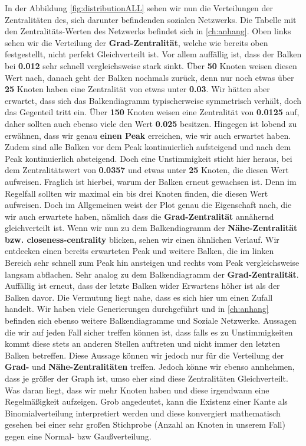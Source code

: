 In der Abbildung \ref{fig:distributionALL} sehen wir nun die Verteilungen der Zentralitäten des, sich darunter befindenden sozialen Netzwerks. Die Tabelle mit den Zentralitäts-Werten des Netzwerks befindet sich in \ref{ch:anhang}. Oben links sehen wir die Verteilung der \textbf{Grad-Zentralität}, welche wie bereits oben festgestellt, nicht perfekt Gleichverteilt ist. Vor allem auffällig ist, dass der Balken bei \textbf{0.012} sehr schnell vergleichsweise stark sinkt. Über \textbf{50} Knoten weisen diesen Wert nach, danach geht der Balken nochmals zurück, denn nur noch etwas über \textbf{25} Knoten haben eine Zentralität von etwas unter \textbf{0.03}. Wir hätten aber erwartet, dass sich das Balkendiagramm typischerweise symmetrisch verhält, doch das Gegenteil tritt ein. Über \textbf{150} Knoten weisen eine Zentralität von \textbf{0.0125} auf, daher sollten auch ebenso viele den Wert \textbf{0.025} besitzen. Hingegen ist lobend zu erwähnen, dass wir genau \textbf{einen Peak} erreichen, wie wir auch erwartet haben. Zudem sind alle Balken vor dem Peak kontinuierlich aufsteigend und nach dem Peak kontinuierlich absteigend. Doch eine Unstimmigkeit sticht hier heraus, bei dem Zentralitätswert von \textbf{0.0357} und etwas unter \textbf{25} Knoten, die diesen Wert aufweisen. Fraglich ist hierbei, warum der Balken erneut gewachsen ist. Denn im Regelfall sollten wir maximal ein bis drei Knoten finden, die diesen Wert aufweisen. Doch im Allgemeinen weist der Plot genau die Eigenschaft nach, die wir auch erwartete haben, nämlich dass die \textbf{Grad-Zentralität} annähernd gleichverteilt ist. Wenn wir nun zu dem Balkendiagramm der \textbf{Nähe-Zentralität bzw. closeness-centrality} blicken, sehen wir einen ähnlichen Verlauf. Wir entdecken einen bereits erwarteten Peak und weitere Balken, die im linken Bereich sehr schnell zum Peak hin ansteigen und rechts vom Peak vergleichsweise langsam abflachen. Sehr analog zu dem Balkendiagramm der \textbf{Grad-Zentralität}. Auffällig ist erneut, dass der letzte Balken wider Erwartens höher ist als der Balken davor. Die Vermutung liegt nahe, dass es sich hier um einen Zufall handelt. Wir haben viele Generierungen durchgeführt und in \ref{ch:anhang} befinden sich ebenso weitere Balkendiagramme und Soziale Netzwerke. Aussagen die wir auf jeden Fall sicher treffen können ist, dass falls es zu Unstimmigkeiten kommt diese stets an anderen Stellen auftreten und nicht immer den letzten Balken betreffen. Diese Aussage können wir jedoch nur für die Verteilung der \textbf{Grad-} und \textbf{Nähe-Zentralitäten} treffen. Jedoch könne wir ebenso annhehmen, dass je größer der Graph ist, umso eher sind diese Zentralitäten Gleichverteilt. Was daran liegt, dass wir mehr Knoten haben und diese irgendwann eine Regelmäßigkeit aufzeigen. Grob angedeutet, kann die Existenz einer Kante als Binomialverteilung interpretiert werden und diese konvergiert mathematisch gesehen bei einer sehr großen Stichprobe (Anzahl an Knoten in unserem Fall) gegen eine Normal- bzw Gaußverteilung.
